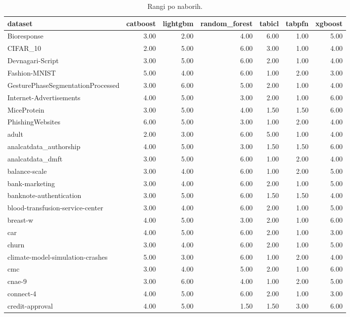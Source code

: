 \begin{table}[htbp]
\centering
\caption{Rangi po naborih.}
\label{tab:ranks}
\begin{tabular}{lrrrrrr}
\hline
dataset & catboost & lightgbm & random\_forest & tabicl & tabpfn & xgboost \\
\hline
Bioresponse & 3.00 & 2.00 & 4.00 & 6.00 & 1.00 & 5.00 \\
CIFAR\_10 & 2.00 & 5.00 & 6.00 & 3.00 & 1.00 & 4.00 \\
Devnagari-Script & 3.00 & 5.00 & 6.00 & 2.00 & 1.00 & 4.00 \\
Fashion-MNIST & 5.00 & 4.00 & 6.00 & 1.00 & 2.00 & 3.00 \\
GesturePhaseSegmentationProcessed & 3.00 & 6.00 & 5.00 & 2.00 & 1.00 & 4.00 \\
Internet-Advertisements & 4.00 & 5.00 & 3.00 & 2.00 & 1.00 & 6.00 \\
MiceProtein & 3.00 & 5.00 & 4.00 & 1.50 & 1.50 & 6.00 \\
PhishingWebsites & 6.00 & 5.00 & 3.00 & 1.00 & 2.00 & 4.00 \\
adult & 2.00 & 3.00 & 6.00 & 5.00 & 1.00 & 4.00 \\
analcatdata\_authorship & 4.00 & 5.00 & 3.00 & 1.50 & 1.50 & 6.00 \\
analcatdata\_dmft & 3.00 & 5.00 & 6.00 & 1.00 & 2.00 & 4.00 \\
balance-scale & 3.00 & 4.00 & 6.00 & 1.00 & 2.00 & 5.00 \\
bank-marketing & 3.00 & 4.00 & 6.00 & 2.00 & 1.00 & 5.00 \\
banknote-authentication & 3.00 & 5.00 & 6.00 & 1.50 & 1.50 & 4.00 \\
blood-transfusion-service-center & 3.00 & 4.00 & 6.00 & 2.00 & 1.00 & 5.00 \\
breast-w & 4.00 & 5.00 & 3.00 & 2.00 & 1.00 & 6.00 \\
car & 4.00 & 5.00 & 6.00 & 2.00 & 1.00 & 3.00 \\
churn & 3.00 & 4.00 & 6.00 & 2.00 & 1.00 & 5.00 \\
climate-model-simulation-crashes & 5.00 & 3.00 & 6.00 & 1.00 & 2.00 & 4.00 \\
cmc & 3.00 & 4.00 & 5.00 & 2.00 & 1.00 & 6.00 \\
cnae-9 & 3.00 & 6.00 & 4.00 & 1.00 & 2.00 & 5.00 \\
connect-4 & 4.00 & 5.00 & 6.00 & 2.00 & 1.00 & 3.00 \\
credit-approval & 4.00 & 5.00 & 1.50 & 1.50 & 3.00 & 6.00 \\

\end{tabular}
\end{table}

